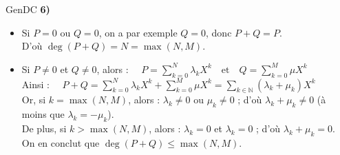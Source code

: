\documentclass[12pt,a4paper]{report}
\begin{document}
\begin{demonstration}{GenDC}
    \textbf{6)} 
     \begin{itemize}[label=$\cdot$, leftmargin=*]
        \item Si $P = 0$ ou $Q = 0$, on a par exemple $Q = 0$, donc $P + Q = P$.\\
        D'où $\deg(P + Q) = N = \max(N, M)$. 
        \item Si $P \neq 0$ et $Q \neq 0$, alors : $\quad \displaystyle P = \sum_{k = 0}^N \lambda_k X^{k} \quad\text{et}\quad Q = \sum_{k = 0}^M \mu X^{k} $\\
        Ainsi : $\quad \displaystyle P + Q = \sum_{k = 0}^N \lambda_k X^{k} + \sum_{k = 0}^M \mu X^{k} = \sum_{k \in \mathbb{N}} (\lambda_k + \mu_k) X^{k}$\\
        Or, si $k = \max(N, M)$, alors : $\lambda_k \neq 0$ ou $\mu_k \neq 0$ ; d'où $\lambda_k + \mu_k \neq 0$ (à moins que $\lambda_k = -\mu_k$).\\
        De plus, si $k > \max(N, M)$, alors : $\lambda_k = 0$ et $\lambda_k = 0$ ; d'où $\lambda_k + \mu_k = 0$.\\
        On en conclut que $\deg(P + Q) \leqslant \max(N, M)$.
    \end{itemize}
\end{demonstration}
\end{document}
